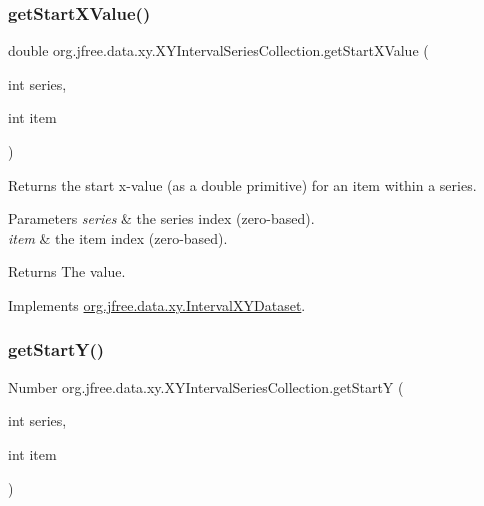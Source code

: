 \subsubsection{\texorpdfstring{get\+Start\+X\+Value()}{getStartXValue()}}
{\footnotesize\ttfamily double org.\+jfree.\+data.\+xy.\+X\+Y\+Interval\+Series\+Collection.\+get\+Start\+X\+Value (\begin{DoxyParamCaption}\item[{int}]{series,  }\item[{int}]{item }\end{DoxyParamCaption})}

Returns the start x-\/value (as a double primitive) for an item within a series.


\begin{DoxyParams}{Parameters}
{\em series} & the series index (zero-\/based). \\
\hline
{\em item} & the item index (zero-\/based).\\
\hline
\end{DoxyParams}
\begin{DoxyReturn}{Returns}
The value. 
\end{DoxyReturn}


Implements \mbox{\hyperlink{interfaceorg_1_1jfree_1_1data_1_1xy_1_1_interval_x_y_dataset_a437afe7f637a8d16ad305023a7819eef}{org.\+jfree.\+data.\+xy.\+Interval\+X\+Y\+Dataset}}.

\mbox{\label{classorg_1_1jfree_1_1data_1_1xy_1_1_x_y_interval_series_collection_a7ab36e2809364dab0db10b575f58ae14}} 
\subsubsection{\texorpdfstring{get\+Start\+Y()}{getStartY()}}
{\footnotesize\ttfamily Number org.\+jfree.\+data.\+xy.\+X\+Y\+Interval\+Series\+Collection.\+get\+StartY (\begin{DoxyParamCaption}\item[{int}]{series,  }\item[{int}]{item }\end{DoxyParamCaption})}


